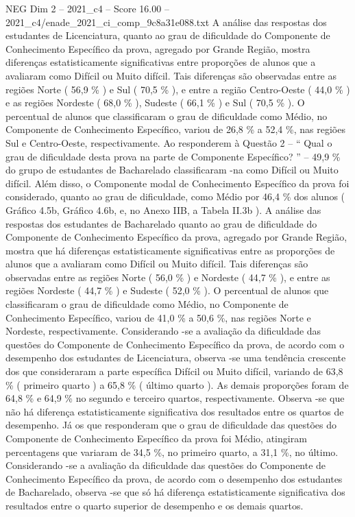 \begin{textsample}{NEG Dim 2 – 2021\_c4 – Score 16.00 – 2021\_c4/enade\_2021\_ci\_comp\_9c8a31e088.txt}
A análise das respostas dos estudantes de Licenciatura, quanto ao grau de dificuldade do Componente de Conhecimento Específico da prova, agregado por Grande Região, mostra diferenças estatisticamente significativas entre proporções de alunos que a avaliaram como Difícil ou Muito difícil.
Tais diferenças são observadas entre as regiões Norte ( 56,9 \% ) e Sul ( 70,5 \% ), e entre a região Centro-Oeste ( 44,0 \% ) e as regiões Nordeste ( 68,0 \% ), Sudeste ( 66,1 \% ) e Sul ( 70,5 \% ).
O percentual de alunos que classificaram o grau de dificuldade como Médio, no Componente de Conhecimento Específico, variou de 26,8 \% a 52,4 \%, nas regiões Sul e Centro-Oeste, respectivamente.
Ao responderem à Questão 2 – “ Qual o grau de dificuldade desta prova na parte de Componente Específico? ” – 49,9 \% do grupo de estudantes de Bacharelado classificaram -na como Difícil ou Muito difícil.
Além disso, o Componente modal de Conhecimento Específico da prova foi considerado, quanto ao grau de dificuldade, como Médio por 46,4 \% dos alunos ( Gráfico 4.5b, Gráfico 4.6b, e, no Anexo IIB, a Tabela II.3b ).
A análise das respostas dos estudantes de Bacharelado quanto ao grau de dificuldade do Componente de Conhecimento Específico da prova, agregado por Grande Região, mostra que há diferenças estatisticamente significativas entre as proporções de alunos que a avaliaram como Difícil ou Muito difícil.
Tais diferenças são observadas entre as regiões Norte ( 56,0 \% ) e Nordeste ( 44,7 \% ), e entre as regiões Nordeste ( 44,7 \% ) e Sudeste ( 52,0 \% ).
O percentual de alunos que classificaram o grau de dificuldade como Médio, no Componente de Conhecimento Específico, variou de 41,0 \% a 50,6 \%, nas regiões Norte e Nordeste, respectivamente.
Considerando -se a avaliação da dificuldade das questões do Componente de Conhecimento Específico da prova, de acordo com o desempenho dos estudantes de Licenciatura, observa -se uma tendência crescente dos que consideraram a parte específica Difícil ou Muito difícil, variando de 63,8 \% ( primeiro quarto ) a 65,8 \% ( último quarto ).
As demais proporções foram de 64,8 \% e 64,9 \% no segundo e terceiro quartos, respectivamente.
Observa -se que não há diferença estatisticamente significativa dos resultados entre os quartos de desempenho.
Já os que responderam que o grau de dificuldade das questões do Componente de Conhecimento Específico da prova foi Médio, atingiram percentagens que variaram de 34,5 \%, no primeiro quarto, a 31,1 \%, no último.
Considerando -se a avaliação da dificuldade das questões do Componente de Conhecimento Específico da prova, de acordo com o desempenho dos estudantes de Bacharelado, observa -se que só há diferença estatisticamente significativa dos resultados entre o quarto superior de desempenho e os demais quartos.

\end{textsample}

